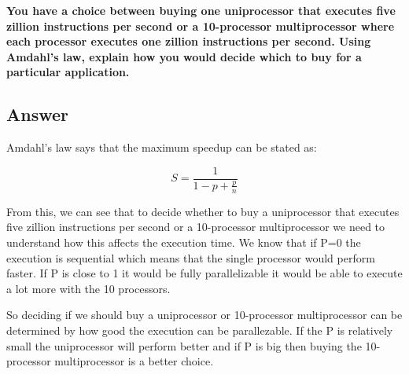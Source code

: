 \documentclass{article}
\begin{document}
\textbf{You have a choice between buying one uniprocessor that executes five zillion instructions per second or a 10-processor multiprocessor where each processor executes one zillion instructions per second. Using Amdahl’s law, explain how you would decide which to buy for a particular application.}

\subsection*{Answer}
Amdahl's law says that the maximum speedup can be stated as:

\[
S = \frac{1}{1 - p + \frac{p}{n}}
\]

From this, we can see that to decide whether to buy a uniprocessor that executes five zillion instructions per second or a 10-processor multiprocessor we need to understand how this affects the execution time. We know that if P=0 the execution is sequential which means that the single processor would perform faster. If P is close to 1 it would be fully parallelizable it would be able to execute a lot more with the 10 processors.

So deciding if we should buy a uniprocessor or 10-processor multiprocessor can be determined by how good the execution can be parallezable. If the P is relatively small the uniprocessor will perform better and if P is big then buying the 10-processor multiprocessor is a better choice.


\newpage
\printbibliography
\end{document}
